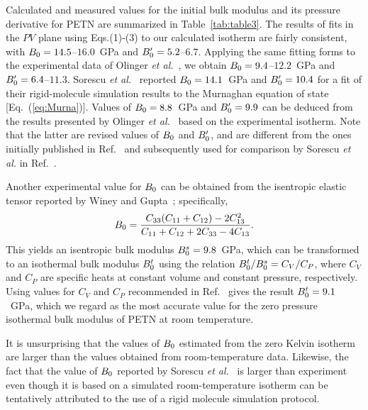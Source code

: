 \documentclass[prb,aps,nobibnotes,twocolumn,doublespace,twocolumngrid,superbib]{revtex4}
\begin{document}
Calculated and measured values for the initial bulk modulus and its
pressure derivative for PETN are summarized in Table~\ref{tab:table3}.
The results of fits in the $PV$ plane using Eqs.(1)-(3) to our
calculated isotherm are fairly consistent, with
$B_0=14.5$--$16.0$~GPa and ${B'_0}=5.2$--$6.7$.  Applying the same
fitting forms to the experimental data of Olinger {\it et
al.}~\cite{Olinger_1975v62}, we obtain $B_0=9.4$--$12.2$~GPa and
${B'_0}=6.4$--$11.3$.  Sorescu {\it et al.}~\cite{Sorescu_1999v103}
reported $B_0=14.1$~GPa and ${B'_0}=10.4 $ for a fit of their
rigid-molecule simulation results to the Murnaghan equation of state
[Eq.~(\ref{eq:Murna})].  Values of $B_0=8.8$~GPa and ${B'_0}=9.9$
can be deduced from the results presented by Olinger {\it et
al.}~\cite{Olinger_1976} based on the experimental isotherm. Note that
the latter are revised values of $B_0$ and ${B'_0}$, and are
different from the ones initially published in
Ref.~\cite{Olinger_1975v62} and subsequently used for comparison by
Sorescu {\it et al.}\/ in Ref.~\cite{Sorescu_1999v103}.  

Another experimental value for $B_0$ can be obtained from the isentropic
elastic tensor reported by Winey and Gupta~\cite{Winey_2001v90};
specifically,
\begin{equation}
B_0=\frac{C_{33}(C_{11}+C_{12})-2C_{13}^2}{C_{11}+C_{12}+2C_{33}-4C_{13}}.
\end{equation}
This yields an isentropic bulk modulus $B_0^{s}=9.8$~GPa, which
can be transformed to an isothermal bulk modulus $B_0^t$ using the
relation $B_0^t/B_0^s=C_V/C_P$, where $C_V$ and $C_P$ are specific
heats at constant volume and constant pressure, respectively.  Using
values for $C_V$ and $C_P$ recommended in Ref.~\cite{Olinger_1976}
gives the result $B_0^t=9.1$~GPa, which we regard as the most accurate 
value for the zero pressure isothermal bulk modulus of PETN at room 
temperature.

It is unsurprising that the values of $B_0$ estimated from the zero
Kelvin isotherm are larger than the values obtained from
room-temperature data.  Likewise, the fact that the value of $B_0$
reported by Sorescu {\it et al.}~\cite{Sorescu_1999v103}
is larger than experiment even though
it is based on a simulated room-temperature isotherm can be
tentatively attributed to the use of a rigid molecule simulation
protocol.
\end{document}
